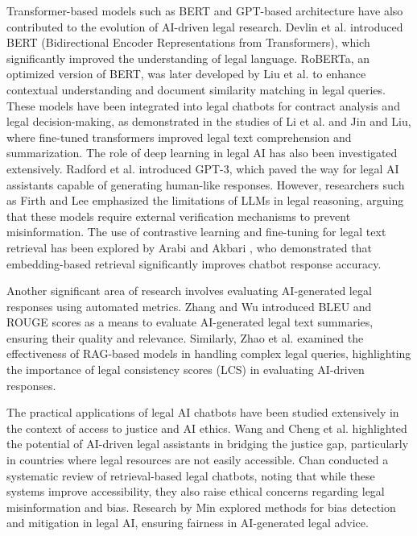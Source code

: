 Transformer-based models such as BERT and GPT-based architecture have also contributed to the evolution of AI-driven legal research. Devlin et al. introduced BERT (Bidirectional Encoder Representations from Transformers), which significantly improved the understanding of legal language. RoBERTa, an optimized version of BERT, was later developed by Liu et al. \cite{liu2019roberta} to enhance contextual understanding and document similarity matching in legal queries. These models have been integrated into legal chatbots for contract analysis and legal decision-making, as demonstrated in the studies of Li et al. and Jin and Liu, where fine-tuned transformers improved legal text comprehension and summarization.  
The role of deep learning in legal AI has also been investigated extensively. Radford et al. introduced GPT-3, which paved the way for legal AI assistants capable of generating human-like responses. However, researchers such as Firth and Lee emphasized the limitations of LLMs in legal reasoning, arguing that these models require external verification mechanisms to prevent misinformation. The use of contrastive learning and fine-tuning for legal text retrieval has been explored by Arabi and Akbari \cite{article}, who demonstrated that embedding-based retrieval significantly improves chatbot response accuracy.  

Another significant area of research involves evaluating AI-generated legal responses using automated metrics. Zhang and Wu introduced BLEU\cite{10.3115/1073083.1073135} and ROUGE\cite{lin-2004-rouge} scores as a means to evaluate AI-generated legal text summaries, ensuring their quality and relevance. Similarly, Zhao et al. \cite{yuan2024rag} examined the effectiveness of RAG-based models in handling complex legal queries, highlighting the importance of legal consistency scores (LCS) in evaluating AI-driven responses.  

The practical applications of legal AI chatbots have been studied extensively in the context of access to justice and AI ethics. Wang and Cheng et al. \cite{xue2024bias} highlighted the potential of AI-driven legal assistants in bridging the justice gap, particularly in countries where legal resources are not easily accessible. Chan conducted a systematic review of retrieval-based legal chatbots, noting that while these systems improve accessibility, they also raise ethical concerns regarding legal misinformation and bias. Research by Min \cite{Min2023ARTIFICIALIA} explored methods for bias detection and mitigation in legal AI, ensuring fairness in AI-generated legal advice.  

